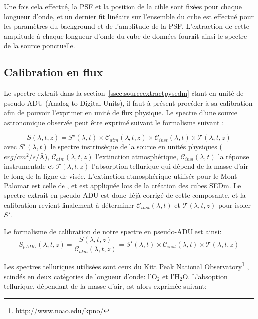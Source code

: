 \documentclass[../main/main.tex]{subfiles}
\begin{document}
Une fois cela effectué, la PSF et la position de la cible sont fixées pour
chaque longueur d'onde, et un dernier fit linéaire sur l'ensemble du
cube est effectué pour les
paramètres du background et de l'amplitude de la PSF. L'extraction de
cette amplitude à chaque longueur d'onde du cube de données fournit
ainsi le spectre de la source ponctuelle.


\subsection{Calibration en flux}\label{ssec:calibpysedm}

Le spectre extrait dans la section~\ref{ssec:sourceextractpysedm} étant en
unité de pseudo-ADU (Analog to Digital Units), il faut à présent procéder à sa
calibration afin de pouvoir l'exprimer en unité de flux physique.
Le spectre d'une source astronomique observée peut être exprimé suivant
le formalisme suivant \citep{Buton2013}:

\begin{equation}
  \label{eq:calibbutoon}
  S(\lambda,t,z)=S^{\star}(\lambda,t)\times\mathcal{C}_{atm}(\lambda,t,z)\times\mathcal{C}_{inst}(\lambda,t)\times\mathcal{T}(\lambda,t,z)
\end{equation}
avec $S^{\star}(\lambda,t)$ le spectre instrinsèque de la source en
unités physiques ($erg/cm^2/s/$\AA), $\mathcal{C}_{atm}(\lambda,t,z)$
l'extinction atmosphérique, $\mathcal{C}_{inst}(\lambda,t)$ la réponse
instrumentale et $\mathcal{T}(\lambda,t,z)$ l'absorption tellurique qui
dépend de la masse d'air le long de la ligne de visée. L'extinction
atmosphérique utilisée pour le Mont Palomar est celle de
\citep{Hayes1975atm}, et est appliquée lors de la création des cubes
SEDm. Le spectre extrait en pseudo-ADU est donc déjà corrigé de cette
composante, et la calibration revient finalement à déterminer $\mathcal{C}_{inst}(\lambda,t)$ et $\mathcal{T}(\lambda,t,z)$ pour isoler $S^{\star}$.

Le formalisme de calibration de notre spectre en pseudo-ADU est ainsi: 
\begin{equation*} 
  S_{pADU}(\lambda,t,z) = \frac{S(\lambda,t,z)}{\mathcal{C}_{atm}(\lambda,t,z)}=S^{\star}(\lambda,t)\times\mathcal{C}_{inst}(\lambda,t)\times\mathcal{T}(\lambda,t,z)
\end{equation*}

Les spectres
telluriques utilisées sont ceux du Kitt Peak National
Observatory\footnote{\url{http://www.noao.edu/kpno/}} \citep{Hinkle2003}, scindés en deux
catégories de longueur d'onde: l'$\text{O}_{2}$ et
l'$\text{H}_{2}\text{O}$.
L'absoption tellurique, dépendant de la masse d'air, est alors exprimée suivant:
\end{document}
